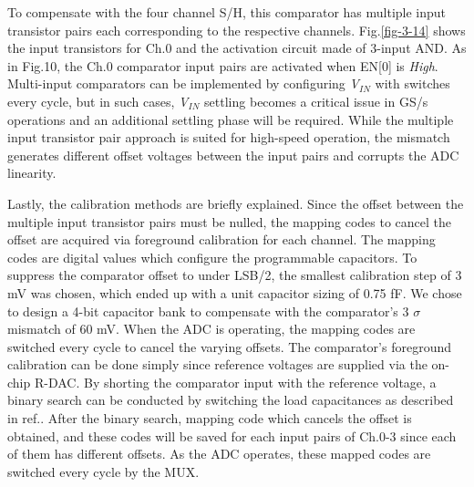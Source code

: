 To compensate with the four channel S/H, this comparator has multiple input transistor pairs each corresponding to the respective channels. Fig.\ref{fig-3-14} shows the input transistors for Ch.0 and the activation circuit made of 3-input AND. As in Fig.10, the Ch.0 comparator input pairs are activated when EN[0] is \textit{High}. Multi-input comparators can be implemented by configuring \textit{V${}_{IN}$} with switches every cycle, but in such cases, \textit{V${}_{IN}$} settling becomes a critical issue in GS/s operations and an additional settling phase will be required. While the multiple input transistor pair approach is suited for high-speed operation, the mismatch generates different offset voltages between the input pairs and corrupts the ADC linearity. 


Lastly, the calibration methods are briefly explained. Since the offset between the multiple input transistor pairs must be nulled, the mapping codes to cancel the offset are acquired via foreground calibration for each channel. The mapping codes are digital values which configure the programmable capacitors. To suppress the comparator offset to under LSB/2, the smallest calibration step of 3 mV was chosen, which ended up with a unit capacitor sizing of 0.75 fF. We chose to design a 4-bit capacitor bank to compensate with the comparator's 3 $\sigma$ mismatch of 60 mV. When the ADC is operating, the mapping codes are switched every cycle to cancel the varying offsets. The comparator's foreground calibration can be done simply since reference voltages are supplied via the on-chip R-DAC. By shorting the comparator input with the reference voltage, a binary search can be conducted by switching the load capacitances as described in ref.\cite{yoshioka20158}. After the binary search, mapping code which cancels the offset is obtained, and these codes will be saved for each input pairs of Ch.0-3 since each of them has different offsets. As the ADC operates, these mapped codes are switched every cycle by the MUX.

